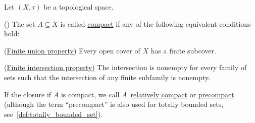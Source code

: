 Let $(X, \tau)$ be a topological space.

\begin{definition}\label{def:compact_set}(\cite[40]{Deimling1985})
  The set $A \subseteq X$ is called \uline{compact} if any of the following equivalent conditions hold:
  \begin{defenum}
    \item\label{def:compact_set/union} (\uline{Finite union property}) Every open cover of $X$ has a finite subcover.
    \item\label{def:compact_set/intersection} (\uline{Finite intersection property}) The intersection is nonempty for every family of sets such that the intersection of any finite subfamily is nonempty.
  \end{defenum}

  If the closure if $A$ is compact, we call $A$~\uline{relatively compact} or \uline{precompact} (although the term \enquote{precompact} is also used for totally bounded sets, see~\ref{def:totally_bounded_set}).
\end{definition}
